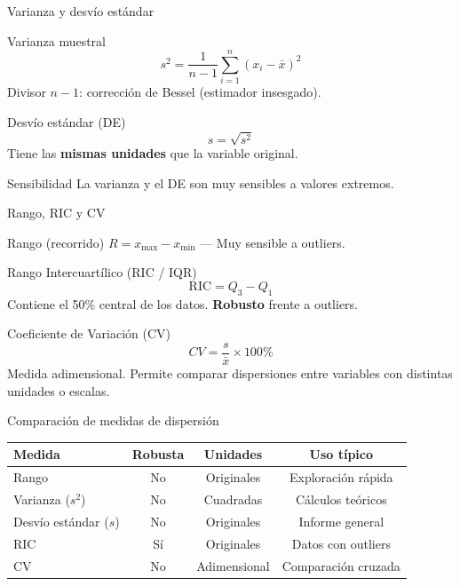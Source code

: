 \documentclass[aspectratio=169]{beamer}
\begin{document}
\begin{frame}{Varianza y desvío estándar}
  \begin{block}{Varianza muestral}
    \[
      s^2 = \frac{1}{n-1}\sum_{i=1}^{n}(x_i - \bar{x})^2
    \]
    Divisor $n-1$: corrección de Bessel (estimador insesgado).
  \end{block}
  \begin{block}{Desvío estándar (DE)}
    \[
      s = \sqrt{s^2}
    \]
    Tiene las \textbf{mismas unidades} que la variable original.
  \end{block}
  \begin{alertblock}{Sensibilidad}
    La varianza y el DE son muy sensibles a valores extremos.
  \end{alertblock}
\end{frame}

\begin{frame}{Rango, RIC y CV}
  \begin{block}{Rango (recorrido)}
    $R = x_{\max} - x_{\min}$ \quad — Muy sensible a outliers.
  \end{block}
  \bigskip
  \begin{block}{Rango Intercuartílico (RIC / IQR)}
    \[
      \text{RIC} = Q_3 - Q_1
    \]
    Contiene el 50\% central de los datos. \textbf{Robusto} frente a outliers.
  \end{block}
  \bigskip
  \begin{block}{Coeficiente de Variación (CV)}
    \[
      CV = \frac{s}{\bar{x}} \times 100\%
    \]
    Medida adimensional. Permite comparar dispersiones entre variables con distintas unidades o escalas.
  \end{block}
\end{frame}

\begin{frame}{Comparación de medidas de dispersión}
  \begin{center}
    \begin{tabular}{lccc}
      \toprule
      \textbf{Medida} & \textbf{Robusta} & \textbf{Unidades} & \textbf{Uso típico} \\
      \midrule
      Rango & No & Originales & Exploración rápida \\
      Varianza ($s^2$) & No & Cuadradas & Cálculos teóricos \\
      Desvío estándar ($s$) & No & Originales & Informe general \\
      RIC & Sí & Originales & Datos con outliers \\
      CV & No & Adimensional & Comparación cruzada \\
      \bottomrule
    \end{tabular}
  \end{center}
\end{frame}
\end{document}
